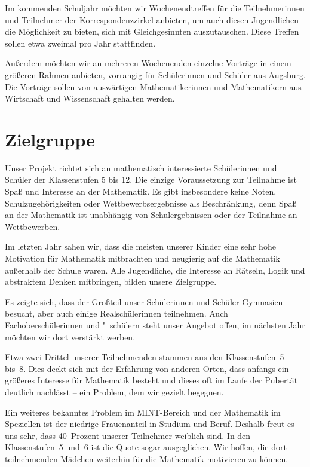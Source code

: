 \documentclass[12pt]{zettel}
\begin{document}
Im kommenden Schuljahr möchten wir Wochenendtreffen für die Teilnehmerinnen und
Teilnehmer der Korrespondenzzirkel anbieten, um auch diesen Jugendlichen die
Möglichkeit zu bieten, sich mit Gleichgesinnten auszutauschen. Diese Treffen
sollen etwa zweimal pro Jahr stattfinden.

Außerdem möchten wir an mehreren Wochenenden einzelne Vorträge in einem
größeren Rahmen anbieten, vorrangig für Schülerinnen und Schüler aus Augsburg.
Die Vorträge sollen von auswärtigen Mathematikerinnen und Mathematikern aus
Wirtschaft und Wissenschaft gehalten werden.


\section{Zielgruppe}

Unser Projekt richtet sich an mathematisch interessierte Schülerinnen
und Schüler der Klassenstufen 5 bis 12. Die einzige Voraussetzung zur
Teilnahme ist Spaß und Interesse an der Mathematik. Es gibt insbesondere
keine Noten, Schulzugehörigkeiten oder Wettbewerbsergebnisse als
Beschränkung, denn Spaß an der Mathematik
ist unabhängig von Schulergebnissen oder der Teilnahme an
Wettbewerben.

Im letzten Jahr sahen wir, dass die meisten unserer Kinder eine
sehr hohe Motivation für Mathematik mitbrachten und neugierig auf die
Mathematik außerhalb der Schule waren. Alle Jugendliche, die Interesse an
Rätseln, Logik und abstraktem Denken mitbringen, bilden unsere
Zielgruppe.

Es zeigte sich, dass der Großteil unser Schülerinnen und
Schüler Gymnasien besucht, aber auch einige Realschülerinnen teilnehmen.
Auch Fachoberschülerinnen und "~schülern steht unser Angebot offen, im nächsten
Jahr möchten wir dort verstärkt werben.

Etwa zwei Drittel unserer Teilnehmenden
stammen aus den Klassenstufen~5 bis~8. 
Dies deckt sich mit der
Erfahrung von anderen Orten, dass anfangs ein größeres Interesse für
Mathematik besteht und dieses oft im Laufe der Pubertät
deutlich nachlässt -- ein Problem, dem wir gezielt begegnen.

Ein weiteres bekanntes Problem im MINT-Bereich
und der Mathematik im Speziellen ist der niedrige Frauenanteil in
Studium und Beruf. Deshalb freut es uns sehr, dass 40~Prozent unserer
Teilnehmer weiblich sind. In den Klassenstufen~5 und~6 ist die Quote sogar
ausgeglichen. Wir hoffen, die dort teilnehmenden Mädchen weiterhin für die
Mathematik motivieren zu können.
\end{document}
